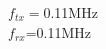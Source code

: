 \documentclass[preview]{standalone}
\begin{document}
\begin{center}
$f_{tx}=$0.11MHz\\$f_{rx}$=0.11MHz
\end{center}
\end{document}
